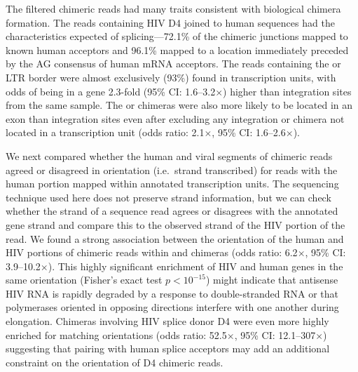 \documentclass[../sherrill-Mix_thesis.tex]{subfiles}
\begin{document}
		The filtered chimeric reads had many traits consistent with biological chimera formation. The reads containing HIV D4 joined to human sequences had the characteristics expected of splicing---72.1\% of the chimeric junctions mapped to known human acceptors and 96.1\% mapped to a location immediately preceded by the AG consensus of human mRNA acceptors. The reads containing the \fivePrime{} or \threePrime{} LTR border were almost exclusively (93\%) found in transcription units, with odds of being in a gene 2.3-fold (95\% CI: 1.6--3.2$\times$) higher than integration sites from the same sample. The \fivePrime{} or \threePrime{} chimeras were also more likely to be located in an exon than integration sites even after excluding any integration or chimera not located in a transcription unit (odds ratio: 2.1$\times$, 95\% CI: 1.6--2.6$\times$).


		 We next compared whether the human and viral segments of chimeric reads agreed or disagreed in orientation (i.e.\  strand transcribed) for reads with the human portion mapped within annotated transcription units. The sequencing technique used here does not preserve strand information, but we can check whether the strand of a sequence read agrees or disagrees with the annotated gene strand and compare this to the observed strand of the HIV portion of the read. We found a strong association between the orientation of the human and HIV portions of chimeric reads within \threePrime{} and \fivePrime{} chimeras (odds ratio: 6.2$\times$, 95\% CI: 3.9--10.2$\times$). This highly significant enrichment of HIV and human genes in the same orientation (Fisher's exact test $p<10^{-15}$) might indicate that antisense HIV RNA is rapidly degraded by a response to double-stranded RNA or that polymerases oriented in opposing directions interfere with one another during elongation. Chimeras involving HIV splice donor D4 were even more highly enriched for matching orientations (odds ratio: 52.5$\times$, 95\% CI: 12.1--307$\times$) suggesting that pairing with human splice acceptors may add an additional constraint on the orientation of D4 chimeric reads.
\end{document}
